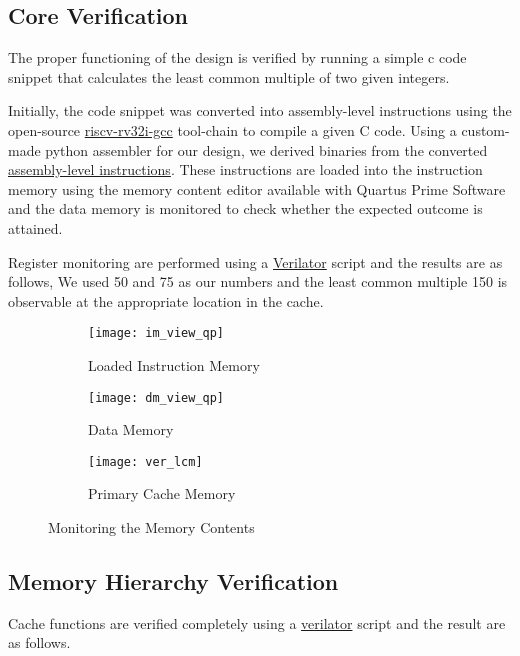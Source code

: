 \documentclass[12pt]{article}
\begin{document}
    \subsection{Core Verification}
    The proper functioning of the design is verified by running a simple c code snippet that calculates the least common multiple of two given integers.
    
    Initially, the code snippet was converted into assembly-level instructions using the open-source \href{https://github.com/riscv-collab/riscv-gnu-toolchain}{riscv-rv32i-gcc} tool-chain to compile a given C code.
    Using a custom-made python assembler for our design, we derived binaries from the converted \href{https://gist.github.com/sanjith1999/31ac024f9fa1efea10b0b24d9ba6ecc6}{assembly-level instructions}.
    These instructions are loaded into the instruction memory using the memory content editor available with Quartus Prime Software and the data memory is monitored to check whether the expected outcome is attained.
    \par
    Register monitoring are performed using a \href{https://gist.github.com/sanjith1999/b7e914d532e387d4d3fc7dbfc8ac7b69}{Verilator} script and the results are as follows,
    We used 50 and 75 as our numbers and the least common multiple 150 is observable at the appropriate location in the cache.
    \begin{figure}[h]
        \begin{subfigure}{.95\columnwidth}
            \centering
            \texttt{[image: im\_view\_qp]}
            \caption{Loaded Instruction Memory}
            \label{fig:im}
        \end{subfigure}
        \begin{subfigure}{.95\columnwidth}
            \centering
            \texttt{[image: dm\_view\_qp]}
            \caption{Data Memory}
            \label{fig:dm}
        \end{subfigure}
        \begin{subfigure}{.98\columnwidth}
            \centering
            \texttt{[image: ver\_lcm]}
            \caption{Primary Cache Memory}
            \label{fig:ver}
        \end{subfigure}
        \caption{Monitoring the Memory Contents}
    \end{figure}
    \vfill
    \subsection{Memory Hierarchy Verification}
    Cache functions are verified completely using a \href{https://gist.github.com/sanjith1999/9955981cf15bb6e9fadb3172c60c5f10}{verilator} script and the result are as follows.
    
    \newpage
    \appendix
\end{document}
